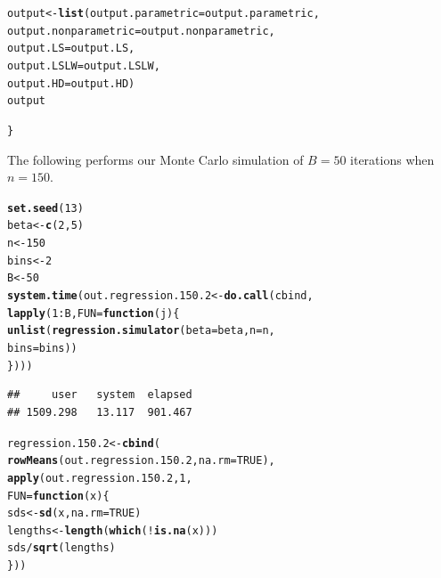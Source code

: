 \documentclass[11pt]{article}\usepackage[]{graphicx}\usepackage[]{color}
\makeatletter
\newcommand{\hlnum}[1]{\textcolor[rgb]{0.686,0.059,0.569}{#1}}%
\newcommand{\hlopt}[1]{\textcolor[rgb]{0,0,0}{#1}}%
\newcommand{\hlstd}[1]{\textcolor[rgb]{0.345,0.345,0.345}{#1}}%
\newcommand{\hlkwa}[1]{\textcolor[rgb]{0.161,0.373,0.58}{\textbf{#1}}}%
\newcommand{\hlkwb}[1]{\textcolor[rgb]{0.69,0.353,0.396}{#1}}%
\newcommand{\hlkwc}[1]{\textcolor[rgb]{0.333,0.667,0.333}{#1}}%
\newcommand{\hlkwd}[1]{\textcolor[rgb]{0.737,0.353,0.396}{\textbf{#1}}}%
\newenvironment{kframe}{%
 \def\at@end@of@kframe{}%
 \ifinner\ifhmode%
  \def\at@end@of@kframe{\end{minipage}}%
  \begin{minipage}{\columnwidth}%
 \fi\fi%
 \def\FrameCommand##1{\hskip\@totalleftmargin \hskip-\fboxsep
 \colorbox{shadecolor}{##1}\hskip-\fboxsep
     \hskip-\linewidth \hskip-\@totalleftmargin \hskip\columnwidth}%
 \MakeFramed {\advance\hsize-\width
   \@totalleftmargin\z@ \linewidth\hsize
   \@setminipage}}%
 {\par\unskip\endMakeFramed%
 \at@end@of@kframe}
\newenvironment{knitrout}{}{} %
\makeatother
\begin{document}
\begin{knitrout}
\begin{kframe}
\begin{alltt}
  \hlstd{output} \hlkwb{<-} \hlkwd{list}\hlstd{(}\hlkwc{output.parametric} \hlstd{= output.parametric,}
    \hlkwc{output.nonparametric} \hlstd{= output.nonparametric,}
    \hlkwc{output.LS} \hlstd{= output.LS,}
    \hlkwc{output.LSLW} \hlstd{= output.LSLW,}
    \hlkwc{output.HD} \hlstd{= output.HD)}
  \hlstd{output}

\hlstd{\}}
\end{alltt}
\end{kframe}
\end{knitrout}


The following performs our Monte Carlo simulation of $B = 50$ iterations 
when $n = 150$.

\begin{knitrout}
\color{fgcolor}\begin{kframe}
\begin{alltt}
\hlkwd{set.seed}\hlstd{(}\hlnum{13}\hlstd{)}
\hlstd{beta} \hlkwb{<-} \hlkwd{c}\hlstd{(}\hlnum{2}\hlstd{,} \hlnum{5}\hlstd{)}
\hlstd{n} \hlkwb{<-} \hlnum{150}
\hlstd{bins} \hlkwb{<-} \hlnum{2}
\hlstd{B} \hlkwb{<-} \hlnum{50}
\hlkwd{system.time}\hlstd{(out.regression.150.2} \hlkwb{<-} \hlkwd{do.call}\hlstd{(cbind,}
  \hlkwd{lapply}\hlstd{(}\hlnum{1}\hlopt{:}\hlstd{B,} \hlkwc{FUN} \hlstd{=} \hlkwa{function}\hlstd{(}\hlkwc{j}\hlstd{)\{}
    \hlkwd{unlist}\hlstd{(}\hlkwd{regression.simulator}\hlstd{(}\hlkwc{beta} \hlstd{= beta,} \hlkwc{n} \hlstd{= n,}
      \hlkwc{bins} \hlstd{= bins))}
\hlstd{\})))}
\end{alltt}
\begin{verbatim}
##     user   system  elapsed 
## 1509.298   13.117  901.467
\end{verbatim}
\end{kframe}
\end{knitrout}

\begin{knitrout}
\color{fgcolor}\begin{kframe}
\begin{alltt}
\hlstd{regression.150.2} \hlkwb{<-} \hlkwd{cbind}\hlstd{(}
  \hlkwd{rowMeans}\hlstd{(out.regression.150.2,} \hlkwc{na.rm} \hlstd{=} \hlnum{TRUE}\hlstd{),}
  \hlkwd{apply}\hlstd{(out.regression.150.2,} \hlnum{1}\hlstd{,}
  \hlkwc{FUN} \hlstd{=} \hlkwa{function}\hlstd{(}\hlkwc{x}\hlstd{)\{}
    \hlstd{sds} \hlkwb{<-} \hlkwd{sd}\hlstd{(x,} \hlkwc{na.rm} \hlstd{=} \hlnum{TRUE}\hlstd{)}
    \hlstd{lengths} \hlkwb{<-} \hlkwd{length}\hlstd{(}\hlkwd{which}\hlstd{(}\hlopt{!}\hlkwd{is.na}\hlstd{(x)))}
    \hlstd{sds} \hlopt{/} \hlkwd{sqrt}\hlstd{(lengths)}
  \hlstd{\}))}
\end{alltt}
\end{kframe}
\end{knitrout}
\end{document}
